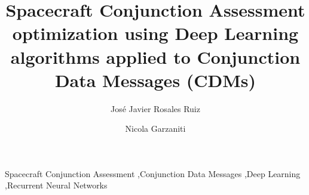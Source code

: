 \documentclass[3p, twocolumn]{elsarticle}
\begin{document}
\begin{frontmatter}

\title{Spacecraft Conjunction Assessment optimization using Deep Learning algorithms applied to Conjunction Data Messages (CDMs)} 



\author{José Javier Rosales Ruiz } %


\author{Nicola Garzaniti} 
            


\begin{abstract}

\end{abstract}

\begin{keyword}
Spacecraft Conjunction Assessment \sep Conjunction Data Messages \sep Deep Learning \sep Recurrent Neural Networks
\end{keyword}

\end{frontmatter}

\linenumbers
\end{document}
